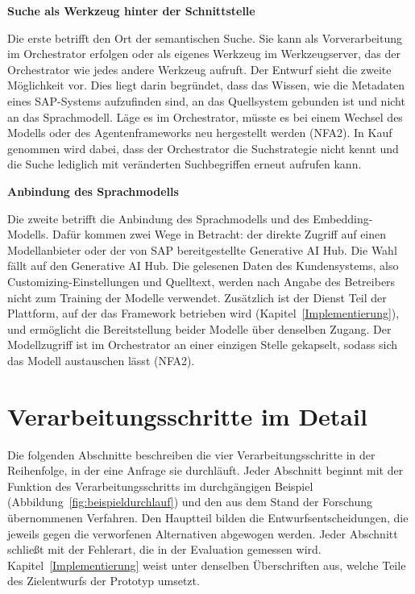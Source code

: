 \textbf{Suche als Werkzeug hinter der Schnittstelle}

Die erste betrifft den Ort der semantischen Suche. Sie kann als Vorverarbeitung im Orchestrator erfolgen oder als eigenes Werkzeug im Werkzeugserver, das der Orchestrator wie jedes andere Werkzeug aufruft. Der Entwurf sieht die zweite Möglichkeit vor. Dies liegt darin begründet, dass das Wissen, wie die Metadaten eines SAP-Systems aufzufinden sind, an das Quellsystem gebunden ist und nicht an das Sprachmodell. Läge es im Orchestrator, müsste es bei einem Wechsel des Modells oder des Agentenframeworks neu hergestellt werden (NFA2). In Kauf genommen wird dabei, dass der Orchestrator die Suchstrategie nicht kennt und die Suche lediglich mit veränderten Suchbegriffen erneut aufrufen kann.

\textbf{Anbindung des Sprachmodells}

Die zweite betrifft die Anbindung des Sprachmodells und des Embedding-Modells. Dafür kommen zwei Wege in Betracht: der direkte Zugriff auf einen Modellanbieter oder der von SAP bereitgestellte Generative AI Hub. Die Wahl fällt auf den Generative AI Hub. Die gelesenen Daten des Kundensystems, also Customizing-Einstellungen und Quelltext, werden nach Angabe des Betreibers nicht zum Training der Modelle verwendet. %
Zusätzlich ist der Dienst Teil der Plattform, auf der das Framework betrieben wird (Kapitel~\ref{Implementierung}), und ermöglicht die Bereitstellung beider Modelle über denselben Zugang. Der Modellzugriff ist im Orchestrator an einer einzigen Stelle gekapselt, sodass sich das Modell austauschen lässt (NFA2).

\section{Verarbeitungsschritte im Detail}
\label{sec:teilaspekte}

Die folgenden Abschnitte beschreiben die vier Verarbeitungsschritte in der Reihenfolge, in der eine Anfrage sie durchläuft. Jeder Abschnitt beginnt mit der Funktion des Verarbeitungsschritts im durchgängigen Beispiel (Abbildung~\ref{fig:beispieldurchlauf}) und den aus dem Stand der Forschung übernommenen Verfahren. Den Hauptteil bilden die Entwurfsentscheidungen, die jeweils gegen die verworfenen Alternativen abgewogen werden. Jeder Abschnitt schließt mit der Fehlerart, die in der Evaluation gemessen wird. Kapitel~\ref{Implementierung} weist unter denselben Überschriften aus, welche Teile des Zielentwurfs der Prototyp umsetzt.

